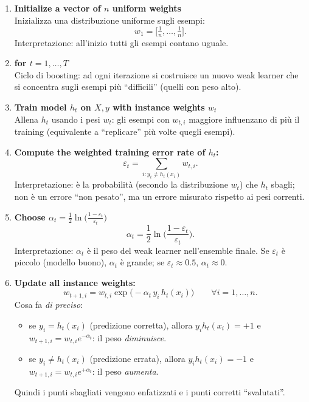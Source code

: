 \begin{enumerate}
\item \textbf{Initialize a vector of $n$ uniform weights}\\
Inizializza una distribuzione uniforme sugli esempi:
\[
w_1=\Big[\tfrac{1}{n},\ldots,\tfrac{1}{n}\Big].
\]
Interpretazione: all'inizio tutti gli esempi contano uguale.

\item \textbf{for $t=1,\ldots,T$}\\
Ciclo di boosting: ad ogni iterazione si costruisce un nuovo weak learner che si concentra sugli esempi più ``difficili'' (quelli con peso alto).

\item \textbf{Train model $h_t$ on $X,y$ with instance weights $w_t$}\\
Allena $h_t$ usando i pesi $w_t$: gli esempi con $w_{t,i}$ maggiore influenzano di più il training (equivalente a ``replicare'' più volte quegli esempi). 

\item \textbf{Compute the weighted training error rate of $h_t$:}\\
\[
\varepsilon_t=\sum_{i: y_i\neq h_t(x_i)} w_{t,i}.
\]
Interpretazione: è la probabilità (secondo la distribuzione $w_t$) che $h_t$ sbagli; non è un errore ``non pesato'', ma un errore misurato rispetto ai pesi correnti.

\item \textbf{Choose $\alpha_t=\tfrac12 \ln\!\Big(\frac{1-\varepsilon_t}{\varepsilon_t}\Big)$}\\
\[
\alpha_t=\frac{1}{2}\ln\Big(\frac{1-\varepsilon_t}{\varepsilon_t}\Big).
\]
Interpretazione: $\alpha_t$ è il peso del weak learner nell'ensemble finale.
Se $\varepsilon_t$ è piccolo (modello buono), $\alpha_t$ è grande; se $\varepsilon_t\approx 0.5$, $\alpha_t\approx 0$. 

\item \textbf{Update all instance weights:}\\
\[
w_{t+1,i}=w_{t,i}\exp\big(-\alpha_t\, y_i\, h_t(x_i)\big)\qquad \forall i=1,\ldots,n.
\]
Cosa fa \emph{di preciso}:
\begin{itemize}
\item se $y_i=h_t(x_i)$ (predizione corretta), allora $y_i h_t(x_i)=+1$ e
$w_{t+1,i}=w_{t,i}e^{-\alpha_t}$: il peso \emph{diminuisce}.
\item se $y_i\neq h_t(x_i)$ (predizione errata), allora $y_i h_t(x_i)=-1$ e
$w_{t+1,i}=w_{t,i}e^{+\alpha_t}$: il peso \emph{aumenta}.
\end{itemize}
Quindi i punti sbagliati vengono enfatizzati e i punti corretti ``svalutati''.


\end{enumerate}
